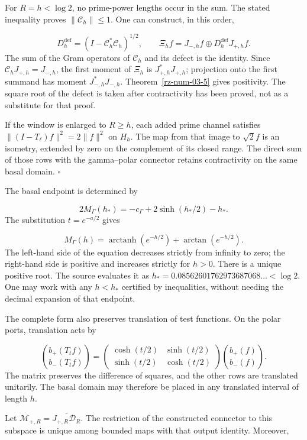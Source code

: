 For \(R=h<\log2\), no prime-power lengths occur in the sum. The stated inequality proves \(\|\mathcal C_h\|\leq1\). One can construct, in this order,

\[
D_h^{\mathrm{def}}=(I-\mathcal C_h^*\mathcal C_h)^{1/2},
\qquad
\Xi_hf=J_{-,h}f\oplus D_h^{\mathrm{def}}J_{+,h}f.
\]
The sum of the Gram operators of \(\mathcal C_h\) and its defect is the identity. Since \(\mathcal C_hJ_{+,h}=J_{-,h}\), the first moment of \(\Xi_h\) is \(J_{+,h}^*J_{+,h}\); projection onto the first summand has moment \(J_{-,h}^*J_{-,h}\). Theorem~\ref{rz-num-03-5} gives positivity. The square root of the defect is taken after contractivity has been proved, not as a substitute for that proof.

If the window is enlarged to \(R\geq h\), each added prime channel satisfies \(\|(I-T_\ell)f\|^2=2\|f\|^2\) on \(H_h\). The map from that image to \(\sqrt2f\) is an isometry, extended by zero on the complement of its closed range. The direct sum of those rows with the gamma–polar connector retains contractivity on the same basal domain. \hfill\(\square\)

The basal endpoint is determined by

\[
2M_\Gamma(h_*)=-c_\Gamma+2\sinh(h_*/2)-h_*.
\]
The substitution \(t=e^{-a/2}\) gives

\[
M_\Gamma(h)=\operatorname{arctanh}(e^{-h/2})
+\arctan(e^{-h/2}).
\]
The left-hand side of the equation decreases strictly from infinity to zero; the right-hand side is positive and increases strictly for \(h>0\). There is a unique positive root. The source evaluates it as \(h_*=0.08562601762973687068\ldots<\log2\). One may work with any \(h<h_*\) certified by inequalities, without needing the decimal expansion of that endpoint.

The complete form also preserves translation of test functions. On the polar ports, translation acts by

\[
\binom{b_+(T_tf)}{b_-(T_tf)}=
\begin{pmatrix}\cosh(t/2)&\sinh(t/2)\\
\sinh(t/2)&\cosh(t/2)\end{pmatrix}
\binom{b_+(f)}{b_-(f)}.
\]
The matrix preserves the difference of squares, and the other rows are translated unitarily. The basal domain may therefore be placed in any translated interval of length \(h\).

Let \(\mathcal M_{+,R}=\overline{J_{+,R}\mathcal D_R}\). The restriction of the constructed connector to this subspace is unique among bounded maps with that output identity. Moreover,

